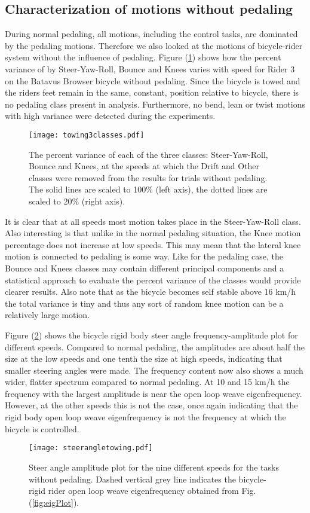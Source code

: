 \documentclass[smallextended]{svjour3}     %
\begin{document}
\subsection{Characterization of motions without pedaling}
\label{sec:noPed}
During normal pedaling, all motions, including the control tasks, are dominated by
the pedaling motions. Therefore we also looked at the motions of bicycle-rider
system without the influence of pedaling. Figure (\ref{missjellybean}) shows
how the percent variance of by Steer-Yaw-Roll, Bounce and Knees
varies with speed for Rider 3 on the Batavus Browser bicycle without pedaling. Since the bicycle
is towed and the riders feet remain in the
same, constant, position relative to bicycle, there is no pedaling class
present in analysis. Furthermore, no bend, lean or twist motions with high
variance were detected during the experiments.
\begin{figure}[tb]
    \centering
        \texttt{[image: towing3classes.pdf]}\\
    \caption{The percent variance of each of the three classes:
    Steer-Yaw-Roll, Bounce and Knees, at the speeds at which the Drift
    and Other classes were removed from the results for trials without
    pedaling. The solid lines are scaled to 100\% (left axis), the dotted lines
    are scaled to 20\% (right axis).}
    \label{missjellybean}
\end{figure}
It is clear that at all speeds most motion takes place in the Steer-Yaw-Roll
class. Also interesting is that unlike in the normal pedaling situation, the
Knee motion percentage does not increase at low speeds. This may mean that the
lateral knee motion is connected to pedaling is some way. Like for the pedaling
case, the Bounce and Knees classes may contain different principal components
and a statistical approach to evaluate the percent variance of the classes
would provide clearer results. Also note that as the bicycle becomes self
stable above 16 km/h the total variance is tiny and thus any sort of random
knee motion can be a relatively large motion.

Figure (\ref{towingsteerangle}) shows the bicycle rigid body steer angle
frequency-amplitude plot for different speeds. Compared to normal pedaling,
the amplitudes are about half the size at the low speeds and one tenth the size
at high speeds, indicating that smaller steering angles were made. The
frequency content now also shows a much wider, flatter spectrum compared to
normal pedaling. At 10 and 15 km/h the frequency with the largest amplitude is
near the open loop weave eigenfrequency. However, at the other speeds this is
not the case, once again indicating that the rigid body open loop weave
eigenfrequency is not the frequency at which the bicycle is controlled.
\begin{figure}[tbp]
    \centering
        \texttt{[image: steerangletowing.pdf]}\\
    \caption{Steer angle amplitude plot for the nine different speeds for the
    tasks without pedaling. Dashed vertical grey line indicates the
    bicycle-rigid rider open loop weave eigenfrequency obtained from Fig.
    (\ref{fig:eigPlot}).}
    \label{towingsteerangle}
\end{figure}
\end{document}
